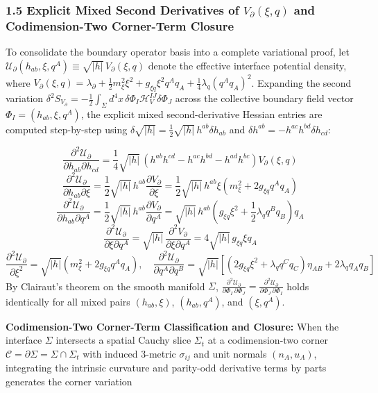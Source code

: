 \documentclass[aps,prd,onecolumn,superscriptaddress,nofootinbib,longbibliography,10pt]{revtex4-2}
\begin{document}
{{  
\subsubsection*{1.5 Explicit Mixed Second Derivatives of \(V_\partial(\xi,q)\) and Codimension-Two Corner-Term Closure}

  To consolidate the boundary operator basis into a complete variational proof, let \(\mathcal{U}_\partial(h_{ab}, \xi, q^A) \equiv \sqrt{|h|}\, V_\partial(\xi, q)\) denote the effective interface potential density, where \(V_\partial(\xi, q) = \lambda_\partial + \frac{1}{2}m_\xi^2 \xi^2 + g_{\xi q}\xi^2 q^A q_A + \frac{1}{4}\lambda_q (q^A q_A)^2\). Expanding the second variation \(\delta^2 S_{V_\partial} = -\frac{1}{2}\int_\Sigma d^4x\, \delta\Phi_I \mathcal{H}_V^{IJ} \delta\Phi_J\) across the collective boundary field vector \(\Phi_I = (h_{ab}, \xi, q^A)\), the explicit mixed second-derivative Hessian entries are computed step-by-step using \(\delta\sqrt{|h|} = \frac{1}{2}\sqrt{|h|}\,h^{ab}\delta h_{ab}\) and \(\delta h^{ab} = -h^{ac}h^{bd}\delta h_{cd}\):


  \[ \frac{\partial^2 \mathcal{U}_\partial}{\partial h_{ab}\partial h_{cd}} = \frac{1}{4}\sqrt{|h|}\,(h^{ab}h^{cd} - h^{ac}h^{bd} - h^{ad}h^{bc})V_\partial(\xi, q) \]
  \[ \frac{\partial^2 \mathcal{U}_\partial}{\partial h_{ab}\partial\xi} = \frac{1}{2}\sqrt{|h|}\,h^{ab}\frac{\partial V_\partial}{\partial\xi} = \frac{1}{2}\sqrt{|h|}\,h^{ab}\xi\left(m_\xi^2 + 2g_{\xi q} q^A q_A\right) \]
  \[ \frac{\partial^2 \mathcal{U}_\partial}{\partial h_{ab}\partial q^A} = \frac{1}{2}\sqrt{|h|}\,h^{ab}\frac{\partial V_\partial}{\partial q^A} = \sqrt{|h|}\,h^{ab}\left(g_{\xi q}\xi^2 + \frac{1}{2}\lambda_q q^B q_B\right)q_A \]
  \[ \frac{\partial^2 \mathcal{U}_\partial}{\partial\xi\partial q^A} = \sqrt{|h|}\,\frac{\partial^2 V_\partial}{\partial\xi\partial q^A} = 4\sqrt{|h|}\,g_{\xi q}\xi q_A \]
  \[ \frac{\partial^2 \mathcal{U}_\partial}{\partial\xi^2} = \sqrt{|h|}\left(m_\xi^2 + 2g_{\xi q} q^A q_A\right), \quad \frac{\partial^2 \mathcal{U}_\partial}{\partial q^A \partial q^B} = \sqrt{|h|}\left[ (2g_{\xi q}\xi^2 + \lambda_q q^C q_C)\eta_{AB} + 2\lambda_q q_A q_B \right] \]
  By Clairaut's theorem on the smooth manifold \(\Sigma\), \(\displaystyle \frac{\partial^{2}\mathcal{U}_{\partial}}{\partial\Phi_{I}\,\partial\Phi_{J}} = \frac{\partial^{2}\mathcal{U}_{\partial}}{\partial\Phi_{J}\,\partial\Phi_{I}}\) holds identically for all mixed pairs \((h_{ab}, \xi)\), \((h_{ab}, q^A)\), and \((\xi, q^A)\).


  \textbf{Codimension-Two Corner-Term Classification and Closure:} When the interface \(\Sigma\) intersects a spatial Cauchy slice \(\Sigma_t\) at a codimension-two corner \(\mathcal{C} = \partial\Sigma = \Sigma \cap \Sigma_t\) with induced 3-metric \(\sigma_{ij}\) and unit normals \((n_A, u_A)\), integrating the intrinsic curvature and parity-odd derivative terms by parts generates the corner variation


}}
\end{document}
